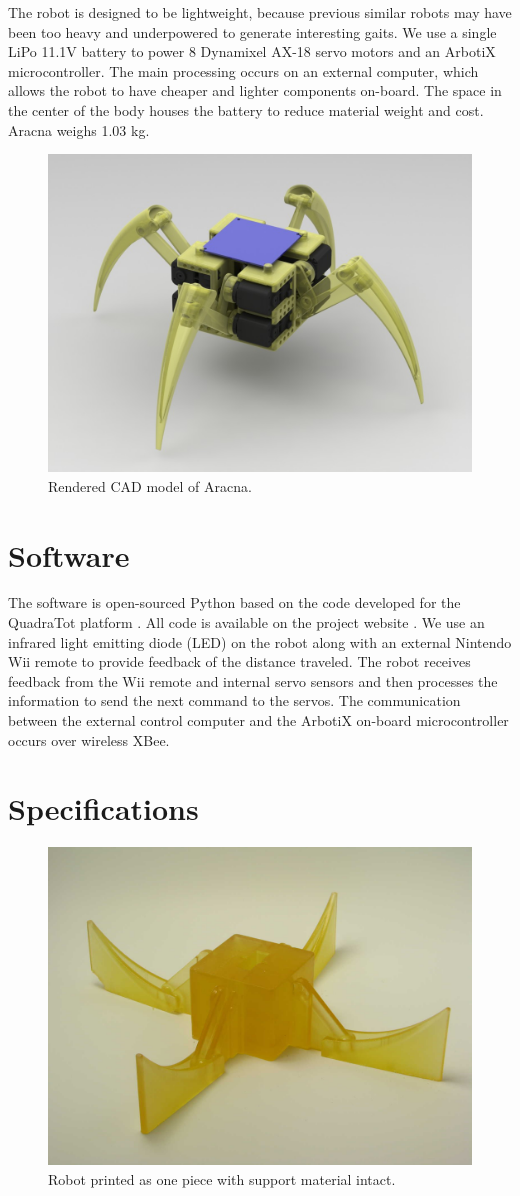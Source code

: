 \documentclass[letterpaper]{article}
\begin{document}
The robot is designed to be lightweight, because previous similar
robots may have been too heavy and underpowered to generate
interesting gaits. We use a single LiPo 11.1V battery to
power 8 Dynamixel AX-18 servo motors and an ArbotiX
microcontroller. The main processing occurs on an external computer,
which allows the robot to have cheaper and lighter components
on-board. The space in the center of the body houses the
battery to reduce material weight and cost. Aracna weighs 1.03 kg.

\begin{figure}[t]
\begin{center}
\includegraphics[width=.37\textwidth]{fig5.jpg}
\caption{Rendered CAD model of Aracna.}
\label{fi52}
\end{center}
\end{figure}



\section{Software}

The software is open-sourced Python based on the
code developed for the QuadraTot platform \citep{JY}. All code is
available on the project website \citep{WEB}. We use an infrared light
emitting diode (LED) on the robot along with an external Nintendo Wii
remote to provide feedback of the distance traveled. The robot
receives feedback from the Wii remote and internal servo sensors and
then processes the information to send the next command to
the servos. The communication between the external control computer
and the ArbotiX on-board microcontroller occurs over wireless XBee.



\section{Specifications}

\begin{figure}[t]
\begin{center}
\includegraphics[width=.37\textwidth]{fig2.jpg}
\caption{Robot printed as one piece with support material intact.}
\label{fig2}
\end{center}
\end{figure}
\end{document}
